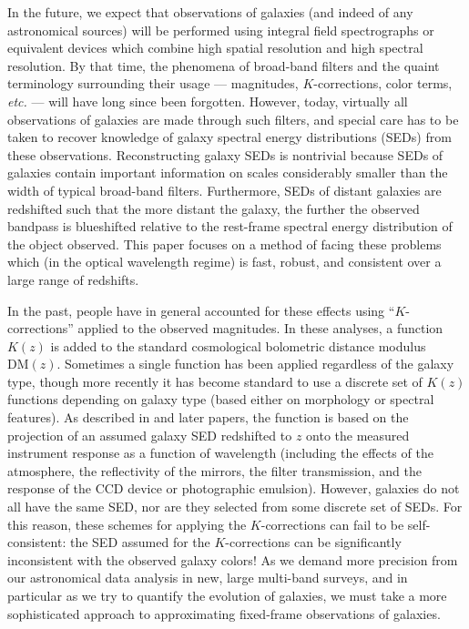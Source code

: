 \documentclass[10pt,preprint]{aastex}
\begin{document}
In the future, we expect that observations of galaxies (and indeed of
any astronomical sources) will be performed using integral field
spectrographs or equivalent devices which combine high spatial
resolution and high spectral resolution. By that time, the phenomena
of broad-band filters and the quaint terminology surrounding their
usage --- magnitudes, $K$-corrections, color terms, {\it etc.} ---
will have long since been forgotten. However, today, virtually all
observations of galaxies are made through such filters, and special
care has to be taken to recover knowledge of galaxy spectral energy
distributions (SEDs) from these observations.  Reconstructing galaxy
SEDs is nontrivial because SEDs of galaxies contain important
information on scales considerably smaller than the width of typical
broad-band filters. Furthermore, SEDs of distant galaxies are
redshifted such that the more distant the galaxy, the further the
observed bandpass is blueshifted relative to the rest-frame spectral
energy distribution of the object observed.  This paper focuses on a
method of facing these problems which (in the optical wavelength
regime) is fast, robust, and consistent over a large range of
redshifts.

In the past, people have in general accounted for these effects using
``$K$-corrections'' applied to the observed magnitudes. In these
analyses, a function $K(z)$ is added to the standard cosmological
bolometric distance modulus $\mathrm{DM}(z)$. Sometimes a single
function has been applied regardless of the galaxy type, though more
recently it has become standard to use a discrete set of $K(z)$
functions depending on galaxy type (based either on morphology or
spectral features). As described in \cite{oke68a} and later papers,
the function is based on the projection of an assumed galaxy SED
redshifted to $z$ onto the measured instrument response as a function
of wavelength (including the effects of the atmosphere, the
reflectivity of the mirrors, the filter transmission, and the response
of the CCD device or photographic emulsion).  However, galaxies do not
all have the same SED, nor are they selected from some discrete set of
SEDs. For this reason, these schemes for applying the $K$-corrections
can fail to be self-consistent: the SED assumed for the
$K$-corrections can be significantly inconsistent with the observed
galaxy colors! As we demand more precision from our astronomical data
analysis in new, large multi-band surveys, and in particular as we try
to quantify the evolution of galaxies, we must take a more
sophisticated approach to approximating fixed-frame observations of
galaxies.
\end{document}
